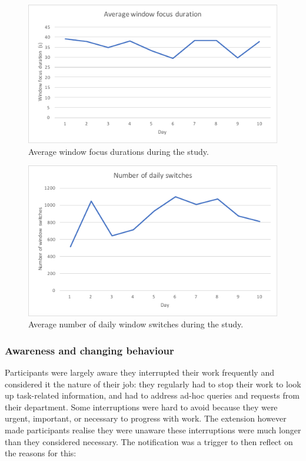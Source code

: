 \begin{figure}
\centering
\centerline{\includegraphics[scale=1]{images/ch56/ch56_MTDurationSwitches.pdf}}
\caption{Average window focus durations during the study.}
\label{fig:ch56-7_mtdurswitches}
\end{figure}

\begin{figure}
\centering
\centerline{\includegraphics[scale=1]{images/ch56/ch56_MTNrSwitches.pdf}}
\caption{Average number of daily window switches during the study.}
\label{fig:ch56-7_mtnrswitches}
\end{figure}

\subsubsection{Awareness and changing behaviour}
Participants were largely aware they interrupted their work frequently and considered it the nature of their job: they regularly had to stop their work to look up task-related information, and had to address ad-hoc queries and requests from their department. Some interruptions were hard to avoid because they were urgent, important, or necessary to progress with work. The extension however made participants realise they were unaware these interruptions were much longer than they considered necessary. The notification was a trigger to then reflect on the reasons for this:

